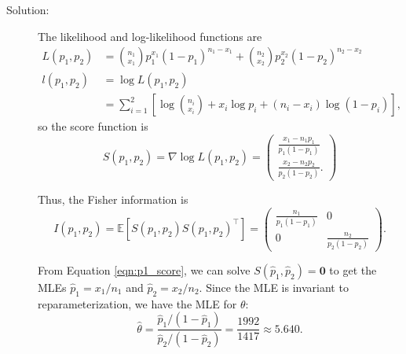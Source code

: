 \documentclass[letterpaper,11pt]{article}
\begin{document}
\begin{enumerate}
\begin{enumerate}
    \begin{description}
    \item[Solution:]
      The likelihood and log-likelihood functions are
      \begin{align}
        L\left(p_1,p_2\right)
        &= {n_1 \choose x_1}p_1^{x_1}\left(1 - p_1\right)^{n_1 - x_1} +
          {n_2 \choose x_2}p_2^{x_2}\left(1 - p_2\right)^{n_2 - x_2}
          \label{eqn:p1_likelihood}\\
        l\left(p_1,p_2\right)
        &= \log L\left(p_1,p_2\right) \nonumber\\
        &= \sum_{i=1}^2\left[
          \log {n_i \choose x_i} + x_i \log p_i + \left(n_i - x_i\right)\log\left(1 - p_i\right)
          \right],
        \nonumber
      \end{align}
      so the score function is
      \begin{equation}
        S\left(p_1,p_2\right)
        = \nabla \log L\left(p_1,p_2\right)
        = \begin{pmatrix}
          \frac{x_1 - n_1p_1}{p_1\left(1 - p_1\right)} \\
          \frac{x_2 - n_2p_2}{p_2\left(1 - p_2\right)}.
        \end{pmatrix}
        \label{eqn:p1_score}
      \end{equation}
      
      Thus, the Fisher information is
      \begin{equation}
        I\left(p_1,p_2\right) = \mathbb{E}\left[
          S\left(p_1,p_2\right)S\left(p_1,p_2\right)^\intercal
        \right]= \begin{pmatrix}
          \frac{n_1}{p_1\left(1 - p_1\right)} & 0 \\
          0 & \frac{n_2}{p_2\left(1 - p_2\right)}
        \end{pmatrix}.
        \label{eqn:p1_fisher_information}
      \end{equation}

      From Equation \ref{eqn:p1_score}, we can solve
      $S\left(\hat{p}_1,\hat{p}_2\right) = \mathbf{0}$ to get the MLEs
      $\hat{p}_1 = x_1/n_1$ and $\hat{p}_2 = x_2/n_2$. Since the MLE is
      invariant to reparameterization, we have the MLE for $\theta$:
      \begin{equation}
        \boxed{\hat{\theta} = \frac{\hat{p}_1/\left(1 - \hat{p}_1\right)}{\hat{p}_2/\left(1 - \hat{p}_2\right)} = \frac{1992}{1417} \approx 5.640.}
        \label{eqn:p1_theta_mle}
      \end{equation}


\end{description}
\end{enumerate}
\end{enumerate}
\end{document}

